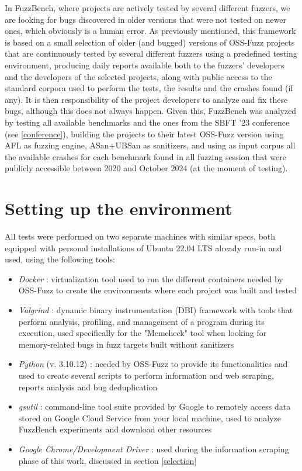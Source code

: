 In FuzzBench, where projects are actively tested by several different fuzzers, we are looking for bugs discovered in older versions that were not tested on newer ones, which obviously is a human error. As previously mentioned, this framework is based on a small selection of older (and bugged) versions of OSS-Fuzz projects that are continuously tested by several different fuzzers using a predefined testing environment, producing daily reports available both to the fuzzers' developers and the developers of the selected projects, along with public access to the standard corpora used to perform the tests, the results and the crashes found (if any). It is then responsibility of the project developers to analyze and fix these bugs, although this does not always happen. Given this, FuzzBench was analyzed by testing all available benchmarks and the ones from the SBFT '23 conference (see \ref{conference}), building the projects to their latest OSS-Fuzz version using AFL as fuzzing engine, ASan+UBSan as sanitizers, and using as input corpus all the available crashes for each benchmark found in all fuzzing session that were publicly accessible between 2020 and October 2024 (at the moment of testing).


\section{Setting up the environment}
All tests were performed on two separate machines with similar specs, both equipped with personal installations of Ubuntu 22.04 LTS already run-in and used, using the following tools:
\begin{itemize}
    \item \textit{Docker} \cite{Docker}: virtualization tool used to run the different containers needed by OSS-Fuzz to create the environments where each project was built and tested
    \item \textit{Valgrind} \cite{Valgrind_1}\cite{Valgrind_2}: dynamic binary instrumentation (DBI) framework with tools that perform analysis, profiling, and management of a program during its execution, used specifically for the "Memcheck" tool when looking for memory-related bugs in fuzz targets built without sanitizers
    \item \textit{Python} (v. 3.10.12) \cite{python}: needed by OSS-Fuzz to provide its functionalities and used to create several scripts to perform information and web scraping, reports analysis and bug deduplication
    \item \textit{gsutil} \cite{gsutil}: command-line tool suite provided by Google to remotely access data stored on Google Cloud Service from your local machine, used to analyze FuzzBench experiments and download other resources
    \item \textit{Google Chrome/Development Driver} \cite{driver}: used during the information scraping phase of this work, discussed in section \ref{selection}
\end{itemize}

